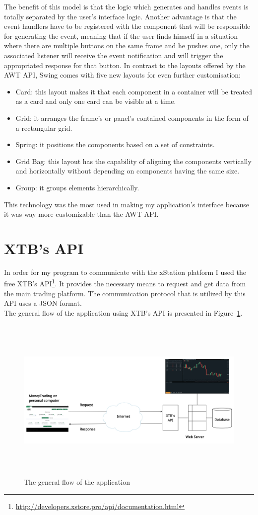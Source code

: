 \documentclass[12pt,a4paper]{report}
\begin{document}
The benefit of this model is that the logic which generates and handles events is totally separated by the user's interface logic. Another advantage is that the event handlers have to be registered with the component that will be responsible for generating the event, meaning that if the user finds himself in a situation where there are multiple buttons on the same frame and he pushes one, only the associated listener will receive the event notification and will trigger the appropriated response for that button.
In contrast to the layouts offered by the AWT API, Swing comes with five new layouts for even further customisation:
\begin{itemize}
	\item Card: this layout makes it that each component in a container will be treated as a card and only one card can be visible at a time.  
	\item Grid: it arranges the frame's or panel's contained components in the form of a rectangular grid.
	\item Spring: it positions the components based on a set of constraints. 
	\item Grid Bag: this layout has the capability of aligning the components vertically and horizontally without depending on components having the same size.  
	\item Group: it groups elements hierarchically.
\end{itemize}
This technology was the most used in making my application's interface because it was way more customizable than the AWT API. 
\section{XTB's API}
In order for my program to communicate with the xStation platform I used the free XTB's API\footnote{\url{http://developers.xstore.pro/api/documentation.html}}. It provides the necessary means to request and get data from the main trading platform. The communication protocol that is utilized by this API uses a JSON format.\\
The general flow of the application using XTB's API is presented in Figure~\ref{fig:flow}.
\begin{figure}[!ht]
	\centering
	\includegraphics[width=16cm,height=8cm]{pics/flow.png}
	\caption{The general flow of the application}
	\label{fig:flow}
\end{figure}
\end{document}
